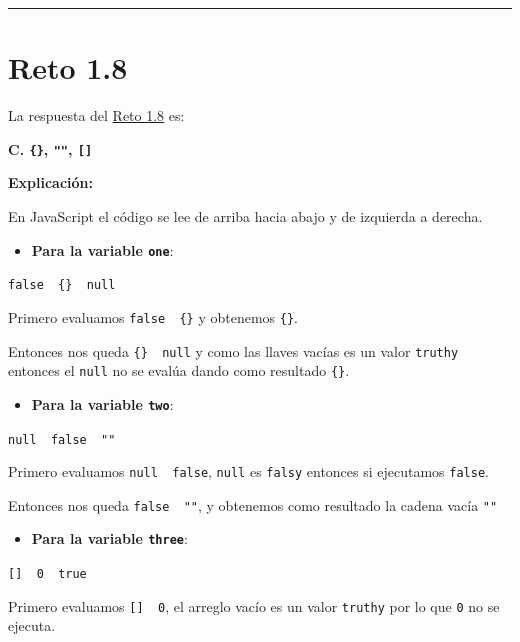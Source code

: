 \documentclass[
  letterpaper,
  DIV=11,
  numbers=noendperiod]{scrreprt}
\providecommand{\tightlist}{%
  \setlength{\itemsep}{0pt}\setlength{\parskip}{0pt}}
\begin{document}
\begin{center}\rule{0.5\linewidth}{0.5pt}\end{center}

\section{Reto 1.8}\label{sec-sol-cap1-reto8}

La respuesta del \hyperref[sec-cap1-reto8]{Reto 1.8} es:

\textbf{C. \texttt{\{\}}, \texttt{""}, \texttt{{[}{]}}}

\textbf{Explicación:}

En JavaScript el código se lee de arriba hacia abajo y de izquierda a
derecha.

\begin{itemize}
\tightlist
\item
  \textbf{Para la variable \texttt{one}}:
\end{itemize}

\texttt{false\ \textbar{}\textbar{}\ \{\}\ \textbar{}\textbar{}\ null}

Primero evaluamos \texttt{false\ \textbar{}\textbar{}\ \{\}} y obtenemos
\texttt{\{\}}.

Entonces nos queda \texttt{\{\}\ \textbar{}\textbar{}\ null} y como las
llaves vacías es un valor \texttt{truthy} entonces el \texttt{null} no
se evalúa dando como resultado \texttt{\{\}}.

\begin{itemize}
\tightlist
\item
  \textbf{Para la variable \texttt{two}}:
\end{itemize}

\texttt{null\ \textbar{}\textbar{}\ false\ \textbar{}\textbar{}\ ""}

Primero evaluamos \texttt{null\ \textbar{}\textbar{}\ false},
\texttt{null} es \texttt{falsy} entonces si ejecutamos \texttt{false}.

Entonces nos queda \texttt{false\ \textbar{}\textbar{}\ ""}, y obtenemos
como resultado la cadena vacía \texttt{""}

\begin{itemize}
\tightlist
\item
  \textbf{Para la variable \texttt{three}}:
\end{itemize}

\texttt{{[}{]}\ \textbar{}\textbar{}\ 0\ \textbar{}\textbar{}\ true}

Primero evaluamos \texttt{{[}{]}\ \textbar{}\textbar{}\ 0}, el arreglo
vacío es un valor \texttt{truthy} por lo que \texttt{0} no se ejecuta.
\end{document}
